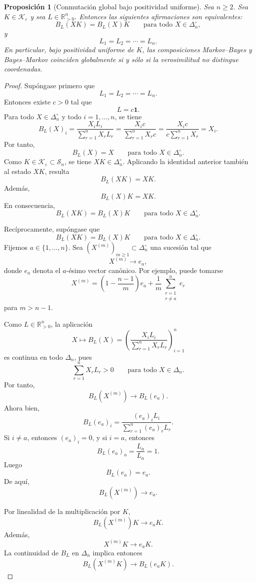 ﻿\documentclass[12pt]{article}
\newtheorem{proposicion}{Proposición}[section]
\begin{document}
\begin{proposicion}[Conmutación global bajo positividad uniforme]
\label{prop:conmutacion_global_MB_BM}
Sea \(n\ge 2\). Sea \(K\in\mathcal K_\varepsilon\) y sea \(L\in\mathbb R_{>0}^n\). Entonces las siguientes afirmaciones son equivalentes:
\[
B_L(XK)=B_L(X)K
\qquad
\text{para todo }X\in\Delta_n^\circ,
\]
y
\[
L_1=L_2=\cdots=L_n.
\]
En particular, bajo positividad uniforme de \(K\), las composiciones Markov--Bayes y Bayes--Markov coinciden globalmente si y sólo si la verosimilitud no distingue coordenadas.
\end{proposicion}

\begin{proof}
Supóngase primero que
\[
L_1=L_2=\cdots=L_n.
\]
Entonces existe \(c>0\) tal que
\[
L=c\mathbf 1.
\]
Para todo \(X\in\Delta_n^\circ\) y todo \(i=1,\dots,n\), se tiene
\[
B_L(X)_i
=
\frac{X_iL_i}{\sum_{r=1}^nX_rL_r}
=
\frac{X_ic}{\sum_{r=1}^nX_rc}
=
\frac{X_ic}{c\sum_{r=1}^nX_r}
=
X_i.
\]
Por tanto,
\[
B_L(X)=X
\qquad
\text{para todo }X\in\Delta_n^\circ.
\]
Como \(K\in\mathcal K_\varepsilon\subset\mathcal S_n\), se tiene \(XK\in\Delta_n^\circ\). Aplicando la identidad anterior también al estado \(XK\), resulta
\[
B_L(XK)=XK.
\]
Además,
\[
B_L(X)K=XK.
\]
En consecuencia,
\[
B_L(XK)=B_L(X)K
\qquad
\text{para todo }X\in\Delta_n^\circ.
\]

Recíprocamente, supóngase que
\[
B_L(XK)=B_L(X)K
\qquad
\text{para todo }X\in\Delta_n^\circ.
\]
Fijemos \(a\in\{1,\dots,n\}\). Sea \((X^{(m)})_{m\ge1}\subset\Delta_n^\circ\) una sucesión tal que
\[
X^{(m)}\longrightarrow e_a,
\]
donde \(e_a\) denota el \(a\)-ésimo vector canónico. Por ejemplo, puede tomarse
\[
X^{(m)}
=
\left(1-\frac{n-1}{m}\right)e_a
+
\frac{1}{m}\sum_{\substack{r=1\\ r\ne a}}^n e_r
\]
para \(m>n-1\).

Como \(L\in\mathbb R_{>0}^n\), la aplicación
\[
X\longmapsto B_L(X)
=
\left(
\frac{X_iL_i}{\sum_{r=1}^nX_rL_r}
\right)_{i=1}^n
\]
es continua en todo \(\Delta_n\), pues
\[
\sum_{r=1}^nX_rL_r>0
\qquad
\text{para todo }X\in\Delta_n.
\]
Por tanto,
\[
B_L(X^{(m)})\longrightarrow B_L(e_a).
\]
Ahora bien,
\[
B_L(e_a)_i
=
\frac{(e_a)_iL_i}{\sum_{r=1}^n(e_a)_rL_r}.
\]
Si \(i\ne a\), entonces \((e_a)_i=0\), y si \(i=a\), entonces
\[
B_L(e_a)_a
=
\frac{L_a}{L_a}
=
1.
\]
Luego
\[
B_L(e_a)=e_a.
\]
De aquí,
\[
B_L(X^{(m)})\longrightarrow e_a.
\]

Por linealidad de la multiplicación por \(K\),
\[
B_L(X^{(m)})K\longrightarrow e_aK.
\]
Además,
\[
X^{(m)}K\longrightarrow e_aK.
\]
La continuidad de \(B_L\) en \(\Delta_n\) implica entonces
\[
B_L(X^{(m)}K)\longrightarrow B_L(e_aK).
\]


\end{proof}
\end{document}
